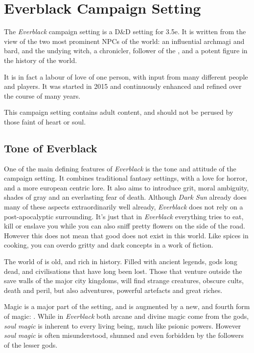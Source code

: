 \chapter{Everblack Campaign Setting}

The \emph{Everblack} campaign setting is a D\&D setting for 3.5e.  It is
written from the view of the two most prominent NPCs of the world:
 an influential archmagi and bard, and
 the undying witch, a chronicler, follower of the
, and a potent figure in the history of the
world.

It is in fact a labour of love of one person, with input from many different
people and players. It was started in 2015 and continuously enhanced and
refined over the course of many years.

This campaign setting contains adult content, and should not be perused by
those faint of heart or soul.

\section{Tone of Everblack}

One of the main defining features of \emph{Everblack} is the tone and attitude
of the campaign setting. It combines traditional fantasy settings, with a love
for horror, and a more european centric lore. It also aims to introduce grit,
moral ambiguity, shades of gray and an everlasting fear of death. Although
\emph{Dark Sun} already does many of these aspects extraordinarily well
already, \emph{Everblack} does not rely on a post-apocalyptic surrounding.
It's just that in \emph{Everblack} everything tries to eat, kill or enslave
you while you can also sniff pretty flowers on the side of the road. However
this does not mean that good does not exist in this world. Like spices in
cooking, you can overdo gritty and dark concepts in a work of fiction.

The world of  is old, and rich in history. Filled with
ancient legends, gods long dead, and civilisations that have long been lost.
Those that venture outside the save walls of the major city kingdoms, will
find strange creatures, obscure cults, death and peril, but also adventures,
powerful artefacts and great riches.

Magic is a major part of the setting, and is augmented by a new, and fourth
form of magic: . While in \emph{Everblack} both arcane
and divine magic come from the gods, \emph{soul magic} is inherent to every
living being, much like psionic powers. However \emph{soul magic} is often
misunderstood, shunned and even forbidden by the followers of the lesser gods.

